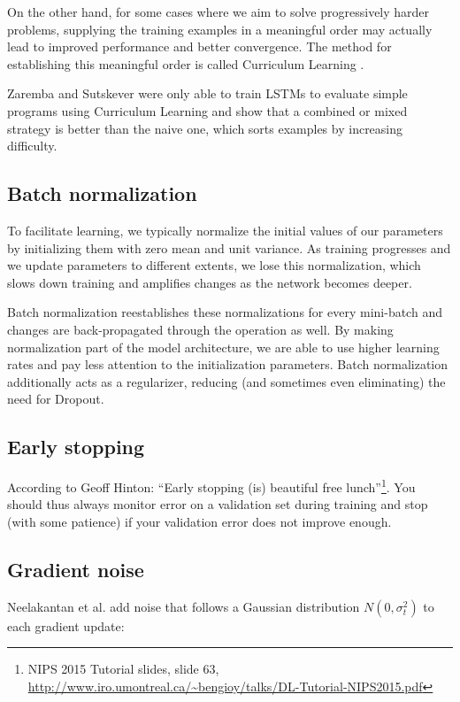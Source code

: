 \documentclass{article}
\begin{document}
On the other hand, for some cases where we aim to solve progressively harder problems, supplying the training examples in a meaningful order may actually lead to improved performance and better convergence. The method for establishing this meaningful order is called Curriculum Learning \cite{Bengio2009a}. 

Zaremba and Sutskever \cite{Zaremba2014a} were only able to train LSTMs to evaluate simple programs using Curriculum Learning and show that a combined or mixed strategy is better than the naive one, which sorts examples by increasing difficulty.

\subsection{Batch normalization}

To facilitate learning, we typically normalize the initial values of our parameters by initializing them with zero mean and unit variance. As training progresses and we update parameters to different extents, we lose this normalization, which slows down training and amplifies changes as the network becomes deeper.

Batch normalization \cite{Ioffe2015a} reestablishes these normalizations for every mini-batch and changes are back-propagated through the operation as well. By making normalization part of the model architecture, we are able to use higher learning rates and pay less attention to the initialization parameters. Batch normalization additionally acts as a regularizer, reducing (and sometimes even eliminating) the need for Dropout.

\subsection{Early stopping}

According to Geoff Hinton: ``Early stopping (is) beautiful free lunch''\footnote{NIPS 2015 Tutorial slides, slide 63,  \url{http://www.iro.umontreal.ca/~bengioy/talks/DL-Tutorial-NIPS2015.pdf}}. You should thus always monitor error on a validation set during training and stop (with some patience) if your validation error does not improve enough.

\subsection{Gradient noise}

Neelakantan et al. \cite{Neelakantan2015} add noise that follows a Gaussian distribution $N(0, \sigma^2_t)$ to each gradient update:
\end{document}
